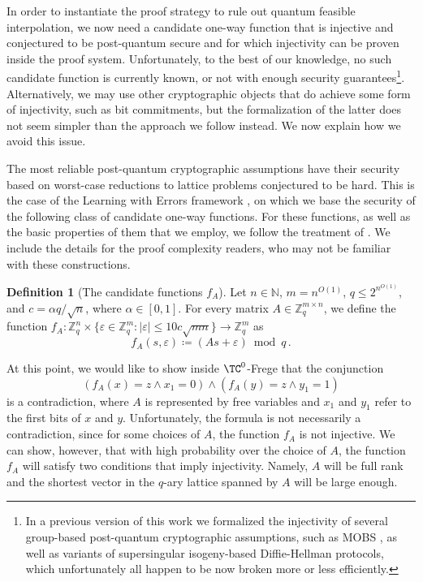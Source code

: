 \documentclass[11pt]{article}
\theoremstyle{definition}
\newtheorem{definition}{Definition}[section]
\theoremstyle{plain}
\theoremstyle{remark}
\newcommand{\bZ}{\mathbb{Z}}
\newcommand{\bN}{\mathbb{N}}
\begin{document}
In order to instantiate the proof strategy to rule out quantum feasible interpolation, we now need a candidate one-way function that is injective and conjectured to be post-quantum secure and for which injectivity can be proven inside the proof system. Unfortunately, to the best of our knowledge, no such candidate function is currently known, or not with enough security guarantees\footnote{In a previous version of this work we formalized the injectivity of several group-based post-quantum cryptographic assumptions, such as MOBS \cite{MOBS}, as well as variants of supersingular isogeny-based Diffie-Hellman protocols, which unfortunately all happen to be now broken more or less efficiently.}. Alternatively, we may use other cryptographic objects that do achieve some form of injectivity, such as bit commitments, but the formalization of the latter does not seem simpler than the approach we follow instead. We now explain how we avoid this issue.

The most reliable post-quantum cryptographic assumptions have their security based on worst-case reductions to lattice problems conjectured to be hard. This is the case of the Learning with Errors framework \cite{regev2009lattices}, on which we base the security of the following class of candidate one-way functions. For these functions, as well as the basic properties of them that we employ, we follow the treatment of \citeauthor{Micciancio2011} \cite{Micciancio2011}. We include the details for the proof complexity readers, who may not be familiar with these constructions.

\begin{definition}[The candidate functions $f_A$]
\label{def:fA}
Let $n\in \bN$, $m = n^{O(1)}$, $q \leq 2^{n^{O(1)}}$, and $c = {\alpha q}/{\sqrt{n}}$, where $\alpha \in [0,1]$. For every matrix $A \in \bZ_q^{m \times n}$, we define the function $f_A:  \mathbb{Z}_q^n \times  \{\varepsilon \in \mathbb{Z}_q^m : |\varepsilon| \leq 10c\sqrt{mn}\} \rightarrow \mathbb{Z}_q^m$ as
\[ f_A(s,\varepsilon)  \coloneqq  (As + \varepsilon) \bmod q\,. \]

\end{definition}


At this point, we would like to show inside $\TC^0$-Frege that the conjunction
\begin{equation}
\label{eq:nice}
   (f_A(x) = z \land x_1 = 0) \land (f_A(y) = z \land y_1 = 1)
\end{equation}
is a contradiction, where $A$ is represented by free variables and $x_1$ and $y_1$ refer to the first bits of $x$ and $y$. Unfortunately, the formula is not necessarily a contradiction, since for some choices of $A$, the function $f_A$ is not injective. We can show, however, that with high probability over the choice of $A$, the function $f_A$ will satisfy two conditions that imply injectivity. Namely, $A$ will be full rank and the shortest vector in the $q$-ary lattice spanned by $A$ will be large enough.
\end{document}
